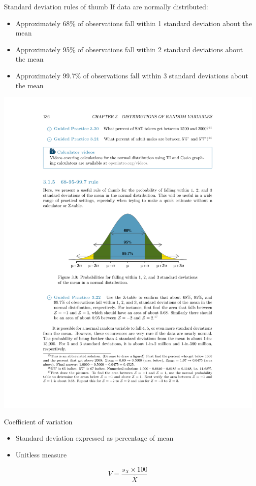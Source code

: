 \documentclass[presentation]{beamer}
\begin{document}
\begin{frame}[label={sec:orgheadline19}]{Standard deviation rules of thumb}
If data are normally distributed:

\begin{itemize}
\item Approximately 68\% of observations fall within 1 standard deviation about the mean
\item Approximately 95\% of observations fall within 2 standard deviations about the mean
\item Approximately 99.7\% of observations fall within 3 standard deviations about the mean
\end{itemize}

\includegraphics[width=.9\linewidth]{sd-rule-thumb.pdf}
\end{frame}

\begin{frame}[label={sec:orgheadline20}]{Coefficient of variation}
\begin{itemize}
\item Standard deviation expressed as percentage of mean
\item Unitless measure
\end{itemize}

\[
V = \frac{s_X \times 100}{\overline{X}}
\]
\end{frame}
\end{document}
